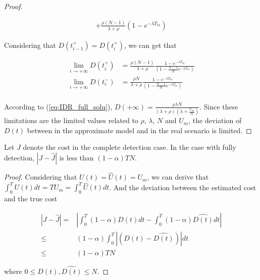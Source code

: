 \begin{proof}
\begin{small}
\begin{equation}
\begin{aligned}
+ \frac{\rho (N-1)}{\lambda + \rho} (1 - e^{-\lambda T_{m}})
\end{aligned}
\end{equation}
\end{small}
Considering that $D(t_{i-1}^{+}) = D(t_{i}^{+})$, we can get that
\begin{small}
\begin{equation}
\nonumber
\begin{aligned}
\lim_{i \rightarrow +\infty} D(t_{i}^{+}) &=
\frac{\rho(N-1)}{\lambda+\rho} \frac{1 - e^{-\lambda T_{m}}}
{(1 - \frac{N-1}{N}e^{-\lambda T_{m}})} \\
\lim_{i \rightarrow +\infty} D(t_{i}^{-}) &=
\frac{\rho N}{\lambda+\rho} \frac{1 - e^{-\lambda T_{m}}}
{(1 - \frac{N-1}{N}e^{-\lambda T_{m}})} \\
\end{aligned}
\end{equation}
\end{small}
According to (\ref{eq:IDR_full_solu}),
$D(+\infty) = \frac{\rho \lambda N}
{(\lambda + \rho)(\lambda + \frac{U_{m}}{N})}$.
Since these limitations are the limited values related to
$\rho$, $\lambda$, $N$ and $U_{m}$,
the deviation of $D(t)$ between in the approximate model and in the real scenario is limited.
\end{proof}

\begin{lem}\label{lem:Jnear}
Let $J$ denote the cost in the complete detection case.
In the case with fully detection,
$|J - \hat{J}|$ is less than $(1-\alpha) T N$.
\end{lem}
\begin{proof}
Considering that $U(t) = \hat{U}(t) = U_{m}$,
we can derive that $\int_{0}^{T} U(t) dt = T U_{m} = \int_{0}^{T} \hat{U}(t) dt $.
And the deviation between the estimated cost and the true cost
\begin{small}
\begin{equation}
\label{eq:delta_J}
\begin{aligned}
|J - \hat{J}| = & \left| \int_{0}^{T} (1-\alpha)D(t) dt - \int_{0}^{T} (1-\alpha) \hat{D(t)} dt \right| \\
\le & (1-\alpha) \int_{0}^{T} |(D(t)-\hat{D(t)})| dt \\
\le & (1-\alpha) T N
\end{aligned}
\end{equation}
\end{small}
where $0 \le D(t), \hat{D(t)} \le N$.

\end{proof}

